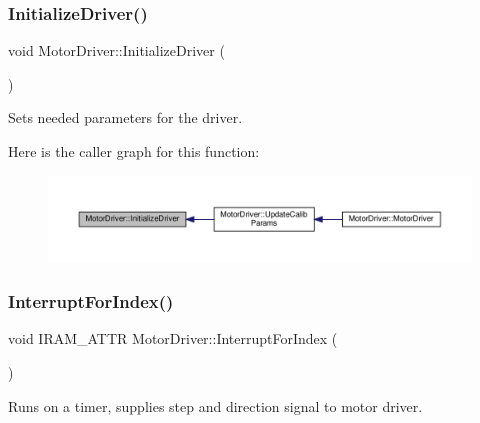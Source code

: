 \subsubsection{\texorpdfstring{Initialize\+Driver()}{InitializeDriver()}}
{\footnotesize\ttfamily void Motor\+Driver\+::\+Initialize\+Driver (\begin{DoxyParamCaption}{ }\end{DoxyParamCaption})\hspace{0.3cm}{\ttfamily [private]}}



Sets needed parameters for the driver. 

Here is the caller graph for this function\+:
\nopagebreak
\begin{figure}[H]
\begin{center}
\leavevmode
\includegraphics[width=350pt]{classMotorDriver_a9151c6649515b7ff61dc6159456ffa80_icgraph}
\end{center}
\end{figure}
\mbox{\label{classMotorDriver_a74f208c889afd6ed5cf5008fbb0fdb63}} 
\subsubsection{\texorpdfstring{Interrupt\+For\+Index()}{InterruptForIndex()}}
{\footnotesize\ttfamily void I\+R\+A\+M\+\_\+\+A\+T\+TR Motor\+Driver\+::\+Interrupt\+For\+Index (\begin{DoxyParamCaption}{ }\end{DoxyParamCaption})\hspace{0.3cm}{\ttfamily [static]}}



Runs on a timer, supplies step and direction signal to motor driver. 


